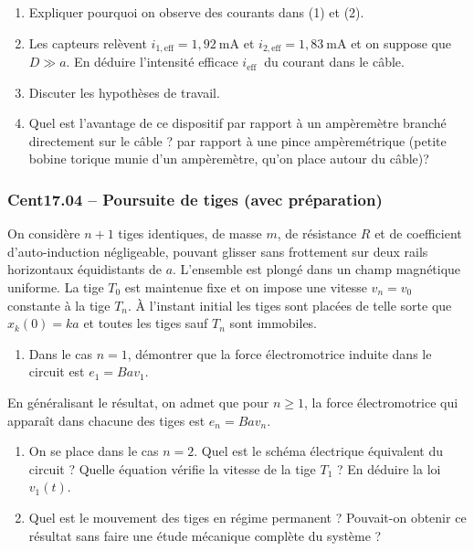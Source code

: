 \begin{center}
\end{center}

\begin{enumerate}
\item Expliquer pourquoi on observe des courants dans (1) et (2).
\item Les capteurs relèvent $i_{1, \mathrm{eff}}=1,92 \mathrm{~mA}$ et $i_{2, \mathrm{eff}}=1,83 \mathrm{~mA}$ et on suppose que $D \gg a$. En déduire l'intensité efficace $i_{\text {eff }}$ du courant dans le câble.
\item Discuter les hypothèses de travail.
\item Quel est l'avantage de ce dispositif par rapport à un ampèremètre branché directement sur le câble ? par rapport à une pince ampèremétrique (petite bobine torique munie d'un ampèremètre, qu'on place autour du câble)?
\end{enumerate}

\newpage
\subsubsection*{Cent17.04 -- Poursuite de tiges (avec préparation)  \corrige}

On considère $n+1$ tiges identiques, de masse $m$, de résistance $R$ et de coefficient d'auto-induction négligeable, pouvant glisser sans frottement sur deux rails horizontaux équidistants de $a$. L'ensemble est plongé dans un champ magnétique uniforme. La tige $T_0$ est maintenue fixe et on impose une vitesse $v_n=v_0$ constante à la tige $T_n$. À l'instant initial les tiges sont placées de telle sorte que $x_k(0)=k a$ et toutes les tiges sauf $T_n$ sont immobiles.


\begin{center}
\end{center}

\begin{enumerate}
\item Dans le cas $n=1$, démontrer que la force électromotrice induite dans le circuit est $e_1=B a v_1$.
\end{enumerate}

En généralisant le résultat, on admet que pour $n \geqslant 1$, la force électromotrice qui apparaît dans chacune des tiges est $e_n=B a v_n$.

\begin{enumerate}[resume]
\item On se place dans le cas $n=2$. Quel est le schéma électrique équivalent du circuit ? Quelle équation vérifie la vitesse de la tige $T_1$ ? En déduire la loi $v_1(t)$.
\item Quel est le mouvement des tiges en régime permanent ? Pouvait-on obtenir ce résultat sans faire une étude mécanique complète du système ?
\end{enumerate}

